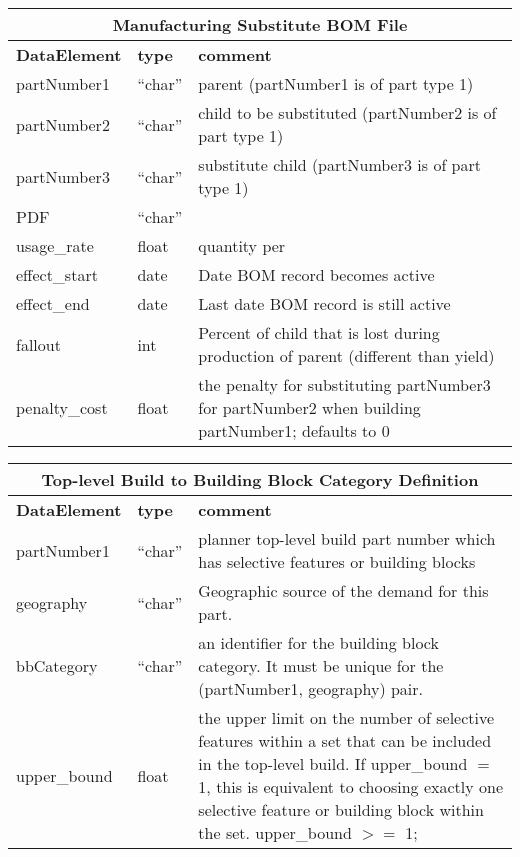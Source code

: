 \vspace{.5in}

\begin{tabular}{llp{4in}}
\multicolumn{3}{c}{{\bf Manufacturing Substitute BOM File}}\\ \hline\hline
{\bf DataElement} &  {\bf type}  &   {\bf comment} \\ \hline
partNumber1 &  ``char'' &    parent (partNumber1 is of part type 1) \\
partNumber2 &  ``char'' &    child to be substituted  
             (partNumber2 is of part type 1) \\
partNumber3 & ``char'' &     substitute child (partNumber3 is of 
              part type 1) \\
PDF     &   ``char'' \\
usage\_rate     &   float  &    quantity per \\
effect\_start   &   date  &     Date BOM record becomes active  \\
effect\_end     &   date  &     Last date BOM record is still active \\
fallout        &   int   &     Percent of child that is lost during
                             production of parent (different than
                             yield) \\
penalty\_cost & float & the penalty for substituting partNumber3 
    for partNumber2 when building partNumber1; defaults to 0
\end{tabular}


\vspace{.5in}

\begin{tabular}{llp{4in}}
\multicolumn{3}{c}{{\bf Top-level Build to Building Block Category Definition}}\\ \hline\hline
{\bf DataElement} &  {\bf type}  &   {\bf comment} \\ \hline
partNumber1 &  ``char'' &    planner top-level build part number which has selective features
                             or building blocks \\
geography &    ``char'' &    Geographic source of the demand for this part. \\
bbCategory &  ``char'' &    an identifier for the building block category.  It must be unique
                            for the (partNumber1, geography) pair. \\
upper\_bound  &     float    &  the upper limit on the number of selective features
                             within a set that can be included in the top-level build.
                             If upper\_bound $=$ 1, this is equivalent to choosing exactly
                             one selective feature or building block within the set. 
                             upper\_bound $>=$ 1; 
\end{tabular}

